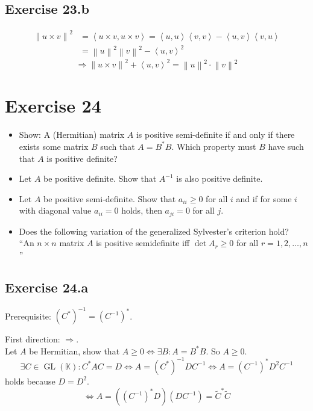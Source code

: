 \documentclass[a4paper]{article}
\theoremstyle{definition}
\newcommand\fun[1]{\left\langle{#1}\right\rangle}
\newcommand\norm[1]{\left\|{#1}\right\|}
\begin{document}
\subsection{Exercise 23.b}
\begin{align*}
  \norm{u \times v}^2
    &= \fun{u \times v, u \times v} = \fun{u,u} \fun{v,v} - \fun{u,v} \fun{v,u} \\
    &= \norm{u}^2 \norm{v}^2 - \fun{u,v}^2
\end{align*}
\[ \Rightarrow \norm{u \times v}^2 + \fun{u,v}^2 = \norm{u}^2 \cdot \norm{v}^2 \]


\section{Exercise 24}
\begin{ex}
  \begin{itemize}
    \item
      Show: A (Hermitian) matrix $A$ is positive semi-definite if and only if
      there exists some matrix $B$ such that $A = B^* B$. Which property
      must $B$ have such that $A$ is positive definite?
    \item
      Let $A$ be positive definite. Show that $A^{-1}$ is also positive definite.
    \item
      Let $A$ be positive semi-definite. Show that $a_{ii} \geq 0$ for all $i$
      and if for some $i$ with diagonal value $a_{ii} = 0$ holds, then $a_{ji} = 0$
      for all $j$.
    \item
      Does the following variation of the generalized Sylvester's criterion hold? \\
      \enquote{An $n \times n$ matrix $A$ is positive semidefinite iff $\det{A_r} \geq 0$
      for all $r = 1,2,\ldots,n$}
  \end{itemize}
\end{ex}

\subsection{Exercise 24.a}
%
Prerequisite: $(C^*)^{-1} = (C^{-1})^*$.

First direction: $\Rightarrow$. \\
Let $A$ be Hermitian, show that $A \geq 0 \Leftrightarrow \exists B: A = B^* B$.
So $A \geq 0$.
\[
  \exists C \in \operatorname{GL}(\mathbb K): C^* A C = D
  \Leftrightarrow
  A = (C^*)^{-1} DC^{-1}
  \Leftrightarrow
  A = (C^{-1})^* D^2 C^{-1}
\]
holds because $D = D^2$.
\[ \Leftrightarrow A = ((C^{-1})^* D) (D C^{-1}) = \tilde{C}^* \tilde{C} \]
\end{document}
